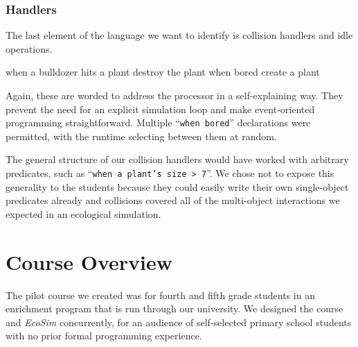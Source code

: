\documentclass{sig-alternate}
\newcommand{\INDSTATE}[1][1]{\STATE\hspace{#1\algorithmicindent}}
\newenvironment{snippet}{\begin{algorithmic}\ttfamily\lsstyle}{\end{algorithmic}}
\newcommand{\code}[1]{``\texttt{\lsstyle#1}''}
\begin{document}
\subsubsection{Handlers}
The last element of the language we want to identify
is collision handlers and idle operations.
\begin{snippet}
\STATE when a bulldozer hits a plant
\INDSTATE destroy the plant
\STATE when bored
\INDSTATE create a plant
\end{snippet}
Again, these are worded to address the processor in a self-explaining way.
They prevent the need for an explicit simulation loop
and make event-oriented programming straightforward.
Multiple \code{when bored} declarations were permitted,
with the runtime selecting between them at random.

The general structure of our collision handlers would have worked with arbitrary predicates, such as \code{when a plant's size > 7}.
We chose not to expose this generality to the students 
because they could easily write their own single-object predicates already
and collisions covered all of the multi-object interactions we expected in an ecological simulation.

\section{Course Overview}
The pilot course we created was for fourth and fifth grade students in an enrichment program
that is run through our university.  We designed the course and \emph{EcoSim} concurrently,
for an audience of self-selected primary school students with no
prior formal programming experience.
\end{document}
